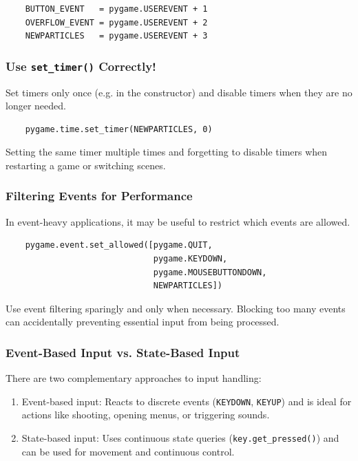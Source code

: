 \lstset{firstnumber=1}
\begin{lstlisting}
	BUTTON_EVENT   = pygame.USEREVENT + 1
	OVERFLOW_EVENT = pygame.USEREVENT + 2
	NEWPARTICLES   = pygame.USEREVENT + 3
\end{lstlisting}


\subsubsection{Use \texttt{set\_timer()} Correctly!}
\begin{hintbox}
	Set timers only once (e.g. in the constructor) and disable timers when they are no longer needed.
\end{hintbox}

\lstset{firstnumber=1}
\begin{lstlisting}
	pygame.time.set_timer(NEWPARTICLES, 0)
\end{lstlisting}

Setting the same timer multiple times and forgetting to disable timers when restarting a game or switching scenes.

\subsubsection{Filtering Events for Performance}

In event-heavy applications, it may be useful to restrict which events are allowed.

\lstset{firstnumber=1}
\begin{lstlisting}
    pygame.event.set_allowed([pygame.QUIT, 
                              pygame.KEYDOWN, 
                              pygame.MOUSEBUTTONDOWN, 
                              NEWPARTICLES])
\end{lstlisting} 

Use event filtering sparingly and only when necessary. Blocking too many events can accidentally preventing essential input from being processed.

\subsubsection{Event-Based Input vs. State-Based Input}

There are two complementary approaches to input handling:
\begin{enumerate}
	\item Event-based input: Reacts to discrete events (\texttt{KEYDOWN}, \texttt{KEYUP}) and is ideal for actions like shooting, opening menus, or triggering sounds.
	
	\item State-based input: Uses continuous state queries (\texttt{key.get\_pressed()}) and can be used for movement and continuous control.
\end{enumerate}

